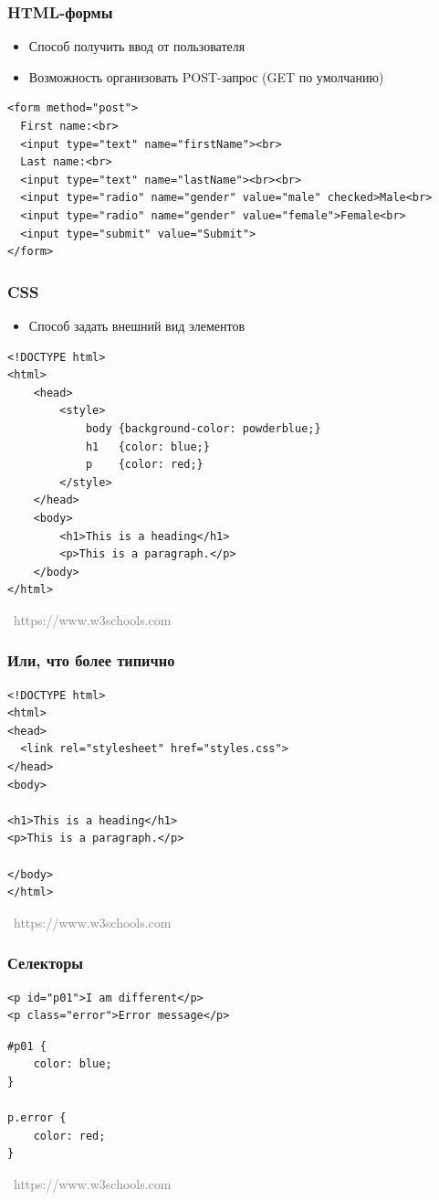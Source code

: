 \documentclass[xetex,mathserif,serif]{beamer}
\newcommand{\attribution}[1] {
\vspace{-5mm}\begin{flushright}\begin{scriptsize}\textcolor{gray}{\textcopyright\, #1}\end{scriptsize}\end{flushright}
}
\begin{document}
    \begin{frame}[fragile]
        \frametitle{HTML-формы}
        \begin{itemize}
            \item Способ получить ввод от пользователя
            \item Возможность организовать POST-запрос (GET по умолчанию)
        \end{itemize}
        \begin{verbatim}
<form method="post">
  First name:<br>
  <input type="text" name="firstName"><br>
  Last name:<br>
  <input type="text" name="lastName"><br><br>
  <input type="radio" name="gender" value="male" checked>Male<br>
  <input type="radio" name="gender" value="female">Female<br>
  <input type="submit" value="Submit">
</form>
        \end{verbatim}
    \end{frame}

    \begin{frame}[fragile]
        \frametitle{CSS}
        \begin{itemize}
            \item Способ задать внешний вид элементов
        \end{itemize}
        \begin{verbatim}
<!DOCTYPE html>
<html>
    <head>
        <style>
            body {background-color: powderblue;}
            h1   {color: blue;}
            p    {color: red;}
        </style>
    </head>
    <body>
        <h1>This is a heading</h1>
        <p>This is a paragraph.</p>
    </body>
</html>
        \end{verbatim}
        \attribution{https://www.w3schools.com}
    \end{frame}

    \begin{frame}[fragile]
        \frametitle{Или, что более типично}
        \begin{verbatim}
<!DOCTYPE html>
<html>
<head>
  <link rel="stylesheet" href="styles.css">
</head>
<body>

<h1>This is a heading</h1>
<p>This is a paragraph.</p>

</body>
</html>
        \end{verbatim}
        \attribution{https://www.w3schools.com}
    \end{frame}

    \begin{frame}[fragile]
        \frametitle{Селекторы}
        \begin{verbatim}
<p id="p01">I am different</p>
<p class="error">Error message</p>
        \end{verbatim}
        \vspace{5mm}
        \begin{verbatim}
#p01 {
    color: blue;
}

p.error {
    color: red;
}
        \end{verbatim}
        \attribution{https://www.w3schools.com}
    \end{frame}
\end{document}
